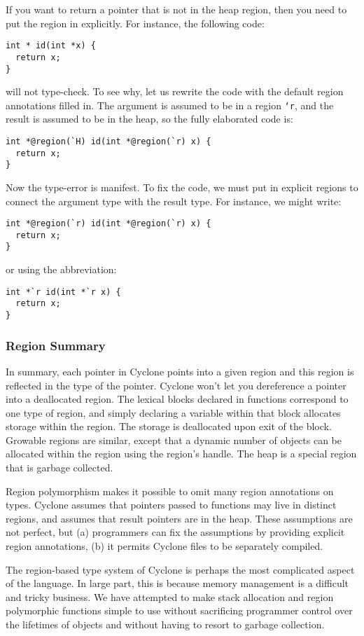If you want to return a pointer that is not in the heap region,
then you need to put the region in explicitly.  For instance,
the following code:
\begin{verbatim}
int * id(int *x) {
  return x;
}
\end{verbatim}
will not type-check.  To see why, let us rewrite the
code with the default region annotations filled in.  The argument
is assumed to be in a region \texttt{`r}, and the result is assumed to be
in the heap, so the fully elaborated code is:
\begin{verbatim}
int *@region(`H) id(int *@region(`r) x) {
  return x;
}
\end{verbatim}
Now the type-error is manifest.  To fix the code, we must put in
explicit regions to connect the argument type with the result type.
For instance, we might write:
\begin{verbatim}
int *@region(`r) id(int *@region(`r) x) {
  return x;
}
\end{verbatim}
or using the abbreviation:
\begin{verbatim}
int *`r id(int *`r x) {
  return x;
}
\end{verbatim}

\subsubsection*{Region Summary}

In summary, each pointer in Cyclone points into a given region
and this region is reflected in the type of the pointer.  Cyclone
won't let you dereference a pointer into a deallocated region.
The lexical blocks declared in functions correspond to one
type of region, and simply declaring a variable within that
block allocates storage within the region.  The storage is
deallocated upon exit of the block.  Growable regions are
similar, except that a dynamic number of objects can be allocated
within the region using the region's handle.  The heap is a
special region that is garbage collected.  

Region polymorphism makes it possible to omit many region 
annotations on types.  Cyclone assumes that pointers passed
to functions may live in distinct regions, and assumes that
result pointers are in the heap.  These assumptions are not
perfect, but (a) programmers can fix the assumptions by providing
explicit region annotations, (b) it permits Cyclone files
to be separately compiled.

The region-based type system of Cyclone is perhaps the most
complicated aspect of the language.  In large part, this is
because memory management is a difficult and tricky business.
We have attempted to make stack allocation and region polymorphic
functions simple to use without sacrificing programmer control
over the lifetimes of objects and without having to resort to
garbage collection.  

